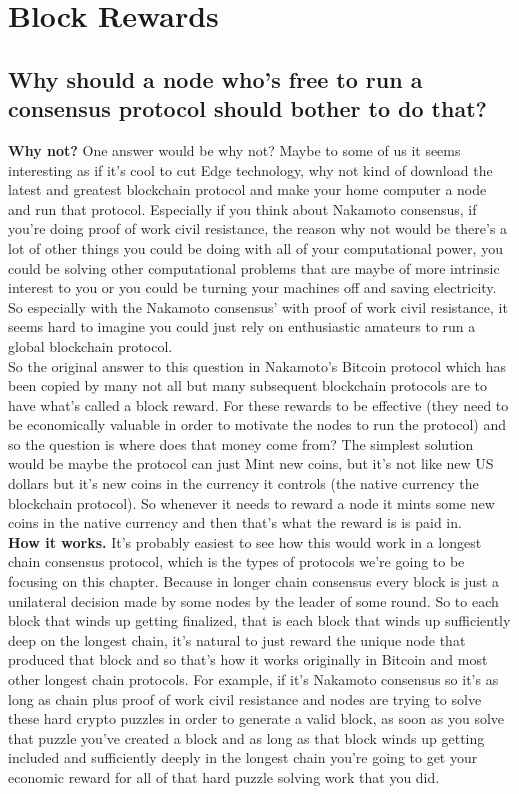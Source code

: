 \section{Block Rewards}
\subsection{Why should a node
who's free to run a consensus
protocol should bother
to do that?} 

\noindent
\textbf{Why not?} One answer would be
why not? Maybe to some of us
it seems interesting as if it's cool to cut
Edge technology, why not kind of download
the latest and greatest blockchain
protocol and make your home
computer a node and run that
protocol. Especially if you
think about Nakamoto consensus, if you're doing proof of work civil
resistance, the reason why not would be there's a
lot of other things you could be doing
with all of your computational power, you could be solving other
computational problems that are maybe of
more intrinsic interest to you or
 you could be turning
your machines off and saving
electricity. So especially with the
Nakamoto consensus' with proof of work
civil resistance, it seems
hard to imagine you could just rely on
enthusiastic amateurs to run a 
global blockchain protocol.\\

So the original answer to this question
in Nakamoto's Bitcoin protocol which
has been copied by many not all but many
subsequent blockchain protocols are to
have what's called a block reward.
For these rewards to
be effective (they need
to be economically valuable in order to
motivate the nodes to run the protocol)
and so the question is where
does that money come from? The simplest solution
would be maybe the
protocol can just Mint new coins, but
it's not like new US dollars
but it's new coins in the currency it
controls (the native currency the
blockchain protocol). So whenever it needs
to reward a node it mints
some new coins in the native currency
and then that's what the reward is is
paid in.\\

\noindent
\textbf{How it works.} It's probably easiest to see how
this would work in a longest chain
consensus protocol, which is the types
of protocols we're going to be focusing
on this chapter. Because in longer chain consensus every block is just a
unilateral decision made by some nodes by the
leader of some round. So to each
block that winds up getting finalized,
that is each block that winds up
sufficiently deep on the longest chain, it's natural to just reward the
unique node that produced that block and so that's how
it works originally in Bitcoin and most other longest chain
protocols.
For example, if it's Nakamoto
consensus so it's as long as chain plus
proof of work civil resistance and nodes
are trying to solve these hard
crypto puzzles in order to 
generate a valid block, as soon as
you solve that puzzle you've
created a block and as long as that
block winds up getting included
and sufficiently deeply in the longest
chain you're going to get your economic
reward for all of that hard puzzle solving
work that you did.\\

